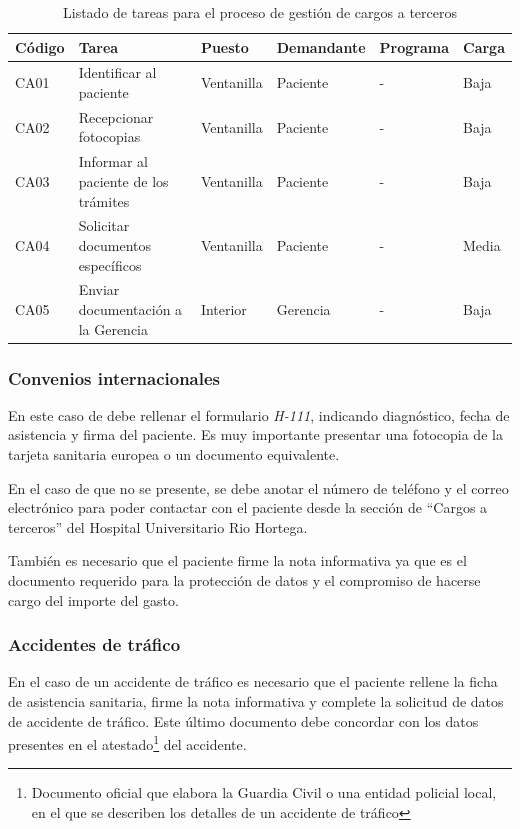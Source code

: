 \begin{table}[H]
    \begin{tabular}{lp{5cm}llll}
        \toprule
        Código & Tarea                                & Puesto     & Demandante & Programa & Carga \\
        \midrule
        CA01   & Identificar al paciente              & Ventanilla & Paciente   & -        & Baja  \\
        CA02   & Recepcionar fotocopias               & Ventanilla & Paciente   & -        & Baja  \\
        CA03   & Informar al paciente de los trámites & Ventanilla & Paciente   & -        & Baja  \\
        CA04   & Solicitar documentos específicos     & Ventanilla & Paciente   & -        & Media \\
        CA05   & Enviar documentación a la Gerencia   & Interior   & Gerencia   & -        & Baja  \\
        \bottomrule
    \end{tabular}
    \caption{Listado de tareas para el proceso de gestión de cargos a terceros}
    \label{tab:proceso-cargos}
\end{table}

\subsubsection{Convenios internacionales}

En este caso de debe rellenar el formulario \textit{H-111}, indicando diagnóstico, fecha de asistencia y firma del paciente.
Es muy importante presentar una fotocopia de la tarjeta sanitaria europea o un documento equivalente.

En el caso de que no se presente, se debe anotar el número de teléfono y el correo electrónico para poder contactar con el paciente desde la sección de ``Cargos a terceros'' del Hospital Universitario Rio Hortega.

También es necesario que el paciente firme la nota informativa ya que es el documento requerido para la protección de datos y el compromiso de hacerse cargo del importe del gasto.

\subsubsection{Accidentes de tráfico}

En el caso de un accidente de tráfico es necesario que el paciente rellene la ficha de asistencia sanitaria, firme la nota informativa y complete la solicitud de datos de accidente de tráfico.
Este último documento debe concordar con los datos presentes en el atestado\footnote{Documento oficial que elabora la Guardia Civil o una entidad policial local, en el que se describen los detalles de un accidente de tráfico} del accidente.

